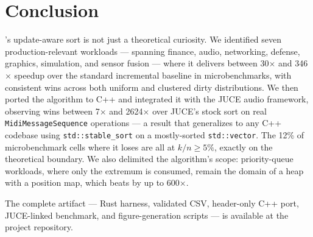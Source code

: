 \section{Conclusion}
\label{sec:concl}

\DeltaSort's update-aware sort is not just a theoretical curiosity. We
identified seven production-relevant workloads --- spanning finance, audio,
networking, defense, graphics, simulation, and sensor fusion --- where it
delivers between 30$\times$ and 346$\times$ speedup over the standard
incremental baseline in microbenchmarks, with consistent wins across both
uniform and clustered dirty distributions. We then ported the algorithm
to C++ and integrated it with the JUCE audio framework, observing
wins between 7$\times$ and 2624$\times$ over JUCE's stock sort on real
\texttt{MidiMessageSequence} operations --- a result that generalizes to
any C++ codebase using \texttt{std::stable\_sort} on a mostly-sorted
\texttt{std::vector}. The 12\% of microbenchmark cells where it loses
are all at $k/n \geq 5\%$, exactly on the theoretical boundary. We also
delimited the algorithm's scope: priority-queue workloads, where only the
extremum is consumed, remain the domain of a heap with a position map,
which beats \DeltaSort by up to 600$\times$.

The complete artifact --- Rust harness, validated CSV, header-only C++
port, JUCE-linked benchmark, and figure-generation scripts --- is
available at the project repository.
